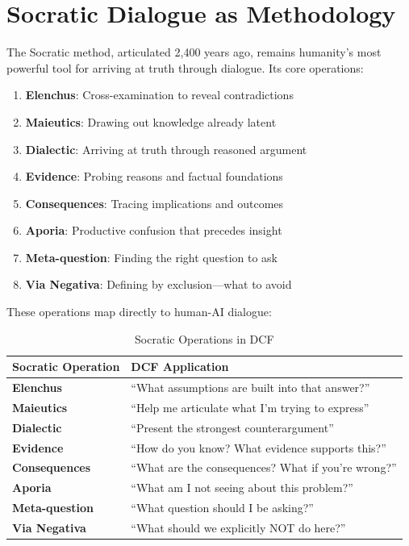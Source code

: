 \chapter{Socratic Dialogue as Methodology}

The Socratic method, articulated 2,400 years ago, remains humanity's most powerful tool for arriving at truth through dialogue. Its core operations:

\begin{enumerate}
    \item \textbf{Elenchus}: Cross-examination to reveal contradictions
    \item \textbf{Maieutics}: Drawing out knowledge already latent
    \item \textbf{Dialectic}: Arriving at truth through reasoned argument
    \item \textbf{Evidence}: Probing reasons and factual foundations
    \item \textbf{Consequences}: Tracing implications and outcomes
    \item \textbf{Aporia}: Productive confusion that precedes insight
    \item \textbf{Meta-question}: Finding the right question to ask
    \item \textbf{Via Negativa}: Defining by exclusion---what to avoid
\end{enumerate}

These operations map directly to human-AI dialogue:

\begin{table}[H]
\centering
\begin{tabular}{ll}
\toprule
\textbf{Socratic Operation} & \textbf{DCF Application} \\
\midrule
\textbf{Elenchus} & ``What assumptions are built into that answer?'' \\
\textbf{Maieutics} & ``Help me articulate what I'm trying to express'' \\
\textbf{Dialectic} & ``Present the strongest counterargument'' \\
\textbf{Evidence} & ``How do you know? What evidence supports this?'' \\
\textbf{Consequences} & ``What are the consequences? What if you're wrong?'' \\
\textbf{Aporia} & ``What am I not seeing about this problem?'' \\
\textbf{Meta-question} & ``What question should I be asking?'' \\
\textbf{Via Negativa} & ``What should we explicitly NOT do here?'' \\
\bottomrule
\end{tabular}
\caption{Socratic Operations in DCF}
\end{table}

